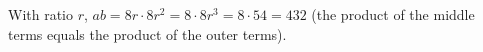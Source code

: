 With ratio $r$, $ab=8r\cdot8r^2=8\cdot8r^3=8\cdot54=\boxed{432}$ (the product of the middle terms equals the product of the outer terms).
